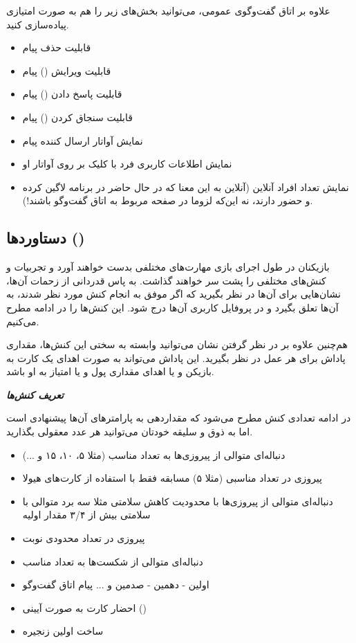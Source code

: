 \documentclass[]{article}
\begin{document}
علاوه بر اتاق گفت‌و‌گوی عمومی، می‌توانید بخش‌های زیر را هم به صورت امتیازی پیاده‌سازی کنید.

\begin{itemize}
	\item قابلیت حذف پیام
	\item  قابلیت ویرایش () پیام
	\item قابلیت پاسخ دادن () پیام
	\item قابلیت سنجاق کردن () پیام
	\item نمایش آواتار ارسال کننده پیام
	\item نمایش اطلاعات کاربری فرد با کلیک بر روی آواتار او
	\item نمایش تعداد افراد آنلاین (آنلاین به این معنا که در حال حاضر در برنامه لاگین کرده و حضور دارند، نه این‌که لزوما در صفحه مربوط به اتاق گفت‌وگو باشند!).
\end{itemize}

\subsection*{{\titr دستاورد‌ها ()}}

بازیکنان در طول اجرای بازی مهارت‌های مختلفی بدست خواهند آورد و تجربیات و کنش‌های مختلفی را پشت سر خواهند گذاشت. به پاس قدردانی از زحمات آن‌ها، نشان‌هایی برای آن‌ها در نظر بگیرید که اگر موفق به انجام کنش مورد نظر شدند، به آن‌ها تعلق بگیرد و در پروفایل کاربری آن‌ها درج شود. این کنش‌ها را در ادامه مطرح می‌کنیم.

هم‌چنین علاوه بر در نظر گرفتن نشان می‌توانید وابسته به سختی این کنش‌ها، مقداری پاداش برای هر عمل در نظر بگیرید. این پاداش می‌تواند به صورت اهدای یک کارت به بازیکن و یا اهدای مقداری پول و یا امتیاز به او باشد.

\textbf{\emph{تعریف کنش‌ها}}

در ادامه تعدادی کنش مطرح می‌شود که مقداردهی به پارامترهای آن‌ها پیشنهادی است اما به ذوق و سلیقه خودتان می‌توانید هر عدد معقولی بگذارید.

\begin{itemize}
	\item دنباله‌ای متوالی از پیروزی‌ها به تعداد مناسب‌ (مثلا ۵، ۱۰، ۱۵ و ...)
	\item پیروزی در تعداد مناسبی‌ (مثلا ۵) مسابقه فقط با استفاده از کارت‌های هیولا
	\item دنباله‌ای متوالی از پیروزی‌ها با محدودیت کاهش سلامتی مثلا سه برد متوالی با سلامتی بیش از ۳/۴ مقدار اولیه
	\item پیروزی در تعداد محدودی نوبت
	\item دنباله‌ای متوالی از شکست‌ها به تعداد مناسب
	\item اولین - دهمین - صدمین و ... پیام اتاق گفت‌وگو
	\item احضار کارت به صورت آیینی ()
	\item ساخت اولین زنجیره
\end{itemize}
\end{document}
